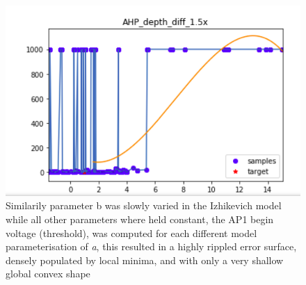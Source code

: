 \begin{figure}
      \centering
      \includegraphics[scale=0.85]{figures/parameter_b_hopeless_surface2.png}
      \caption[cross section of difficult or hopeless error surface]{Similarily parameter b was slowly varied in the Izhikevich model while all other parameters where held constant, the AP1 begin voltage (threshold), was computed for each different model parameterisation of \emph{a}, this resulted in a highly rippled error surface, densely populated by local minima, and with only a very shallow global convex shape}
      \label{fig:discontinuous_constraint}
\end{figure}


